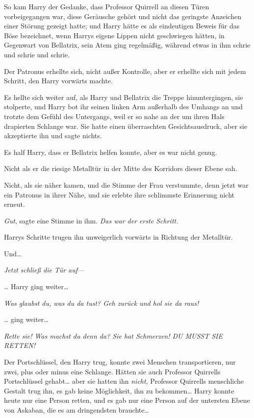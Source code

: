 {So kam Harry der Gedanke, dass Professor Quirrell an diesen Türen vorbeigegangen war, diese Geräusche gehört und nicht das geringste Anzeichen einer Störung gezeigt hatte; und Harry hätte es als eindeutigen Beweis für das Böse bezeichnet, wenn Harrys eigene Lippen nicht geschwiegen hätten, in Gegenwart von Bellatrix, sein Atem ging regelmäßig, während etwas in ihm schrie und schrie und schrie.

Der Patronus erhellte sich, nicht außer Kontrolle, aber er erhellte sich mit jedem Schritt, den Harry vorwärts machte.

Es hellte sich weiter auf, als Harry und Bellatrix die Treppe hinuntergingen, sie stolperte, und Harry bot ihr seinen linken Arm außerhalb des Umhangs an und trotzte dem Gefühl des Untergangs, weil er so nahe an der um ihren Hals drapierten Schlange war. Sie hatte einen überraschten Gesichtsausdruck, aber sie akzeptierte ihn und sagte nichts.

Es half Harry, dass er Bellatrix helfen konnte, aber es war nicht genug.

Nicht als er die riesige Metalltür in der Mitte des Korridors dieser Ebene sah.

Nicht, als sie näher kamen, und die Stimme der Frau verstummte, denn jetzt war ein Patronus in ihrer Nähe, und sie erlebte ihre schlimmste Erinnerung nicht erneut.

\emph{Gut}, sagte eine Stimme in ihm. \emph{Das war der erste Schritt.}

Harrys Schritte trugen ihn unweigerlich vorwärts in Richtung der Metalltür.

Und…

\emph{Jetzt schließ die Tür auf—}

… Harry ging weiter…

\emph{Was glaubst du, was du da tust? Geh zurück und hol sie da raus!}

… ging weiter…

\emph{Rette sie! Was machst du denn da? Sie hat Schmerzen! DU MUSST SIE RETTEN!}

Der Portschlüssel, den Harry trug, konnte zwei Menschen transportieren, nur zwei, plus oder minus eine Schlange. Hätten sie auch Professor Quirrells Portschlüssel gehabt… aber sie hatten ihn \emph{nicht}, Professor Quirrells menschliche Gestalt trug ihn, es gab keine Möglichkeit, ihn zu bekommen… Harry konnte heute nur eine Person retten, und es gab nur eine Person auf der untersten Ebene von Askaban, die es am dringendsten brauchte…

}
